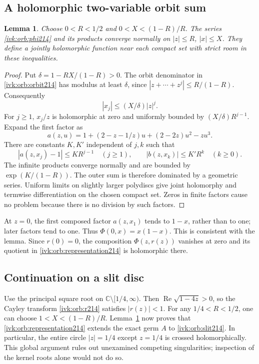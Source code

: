 \documentclass[11pt,letterpaper]{article}
\newtheorem{lemma}[theorem]{Lemma}
\theoremstyle{remark}\newtheorem{remark}[theorem]{Remark}
\newcommand{\C}{\mathbb C}
\begin{document}
\subsection{A holomorphic two-variable orbit sum}
\begin{lemma}\label{ivk:orb:normal214}
Choose $0<R<1/2$ and $0<X<(1-R)/R$. The series \eqref{ivk:orb:phi214}
and its products converge normally on $|z|\le R$, $|x|\le X$.
They define a jointly holomorphic function near each compact set
with strict room in these inequalities.
\end{lemma}
\begin{proof}
Put $\delta=1-RX/(1-R)>0$. The orbit denominator in
\eqref{ivk:orb:orbit214} has modulus at least $\delta$, since
$|z+\cdots+z^j|\le R/(1-R)$. Consequently
\[
|x_j|\le (X/\delta)|z|^j.
\]
For $j\ge1$, $x_j/z$ is holomorphic at zero and uniformly bounded
by $(X/\delta)R^{j-1}$. Expand the first factor as
\begin{equation}\label{ivk:orb:expand_a214}
a(z,u)=1+(2-z-1/z)u+(2-2z)u^2-zu^3.
\end{equation}
There are constants $K,K'$ independent of $j,k$ such that
\[
|a(z,x_j)-1|\le KR^{j-1}\quad(j\ge1),\qquad
|b(z,x_k)|\le K'R^k\quad(k\ge0).
\]
The infinite products converge normally and are bounded by
$\exp(K/(1-R))$. The outer sum is therefore dominated by a geometric
series. Uniform limits on slightly larger polydiscs give joint
holomorphy and termwise differentiation on the chosen compact set.
Zeros in finite factors cause no problem because there is no division
by such factors.
\end{proof}
At $z=0$, the first composed factor $a(z,x_1)$ tends to $1-x$, rather
than to one; later factors tend to one. Thus $\Phi(0,x)=x(1-x)$.
This is consistent with the lemma. Since $r(0)=0$, the composition
$\Phi(z,r(z))$ vanishes at zero and its quotient in
\eqref{ivk:orb:representation214} is holomorphic there.

\subsection{Continuation on a slit disc}\label{ivk:orb:sec:slit}
Use the principal square root on $\C\setminus[1/4,\infty)$.
Then $\operatorname{Re}\sqrt{1-4z}>0$, so the Cayley transform
\eqref{ivk:orb:r214} satisfies $|r(z)|<1$. For any $1/4<R<1/2$, one can choose
$1<X<(1-R)/R$. Lemma~\ref{ivk:orb:normal214} now proves that
\eqref{ivk:orb:representation214} extends the exact germ $A$ to
\eqref{ivk:orb:slit214}. In particular, the entire circle $|z|=1/4$ except
$z=1/4$ is crossed holomorphically. This global argument rules out
unexamined competing singularities; inspection of the kernel roots
alone would not do so.
\end{document}

